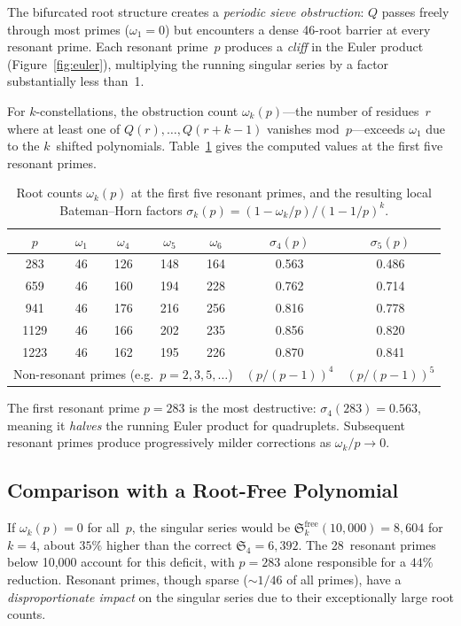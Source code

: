 \documentclass[11pt,a4paper]{article}
\begin{document}
The bifurcated root structure creates a \emph{periodic sieve
obstruction}: $Q$ passes freely through most primes
($\omega_1 = 0$) but encounters a dense 46-root barrier at every
resonant prime.  Each resonant prime~$p$ produces a \emph{cliff}
in the Euler product (Figure~\ref{fig:euler}), multiplying the
running singular series by a factor substantially less than~1.

For $k$-constellations, the obstruction count $\omega_k(p)$---the
number of residues~$r$ where at least one of $Q(r), \ldots,
Q(r{+}k{-}1)$ vanishes mod~$p$---exceeds $\omega_1$ due to the
$k$~shifted polynomials.  Table~\ref{tab:omega} gives the computed
values at the first five resonant primes.

\begin{table}[H]
\centering
\caption{Root counts $\omega_k(p)$ at the first five resonant
primes, and the resulting local Bateman--Horn factors
$\sigma_k(p) = (1 - \omega_k/p)/(1 - 1/p)^k$.}\label{tab:omega}
\smallskip
\begin{tabular}{ccccccc}
\toprule
$p$ & $\omega_1$ & $\omega_4$ & $\omega_5$ & $\omega_6$ &
  $\sigma_4(p)$ & $\sigma_5(p)$ \\
\midrule
283  & 46 & 126 & 148 & 164 & 0.563 & 0.486 \\
659  & 46 & 160 & 194 & 228 & 0.762 & 0.714 \\
941  & 46 & 176 & 216 & 256 & 0.816 & 0.778 \\
1129 & 46 & 166 & 202 & 235 & 0.856 & 0.820 \\
1223 & 46 & 162 & 195 & 226 & 0.870 & 0.841 \\
\midrule
\multicolumn{5}{l}{Non-resonant primes (e.g.\ $p = 2, 3, 5, \ldots$)}
& $(p/(p{-}1))^4$ & $(p/(p{-}1))^5$ \\
\bottomrule
\end{tabular}
\end{table}

The first resonant prime $p = 283$ is the most destructive:
$\sigma_4(283) = 0.563$, meaning it \emph{halves} the running
Euler product for quadruplets.  Subsequent resonant primes produce
progressively milder corrections as $\omega_k/p \to 0$.

\subsection{Comparison with a Root-Free Polynomial}

If $\omega_k(p) = 0$ for all~$p$, the singular series would be
$\mathfrak{S}_k^{\mathrm{free}}(10{,}000) = 8{,}604$ for $k=4$,
about $35\%$ higher than the correct $\mathfrak{S}_4 = 6{,}392$.
The 28~resonant primes below 10{,}000 account for this deficit,
with $p = 283$ alone responsible for a $44\%$ reduction.
Resonant primes, though sparse ($\sim 1/46$ of all primes), have
a \emph{disproportionate impact} on the singular series due to
their exceptionally large root counts.
\end{document}
